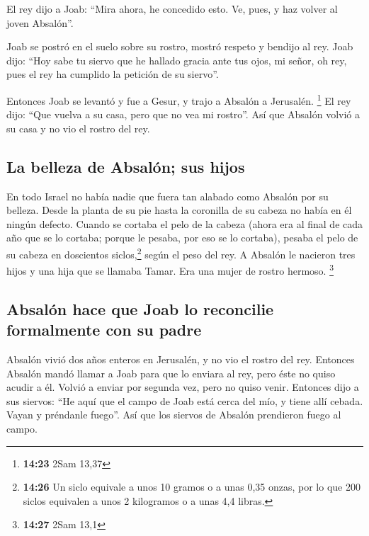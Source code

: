  El rey dijo a Joab: ``Mira ahora, he concedido esto. Ve,
pues, y haz volver al joven Absalón''.

 Joab se postró en el suelo sobre su rostro, mostró
respeto y bendijo al rey. Joab dijo: ``Hoy sabe tu siervo que he hallado
gracia ante tus ojos, mi señor, oh rey, pues el rey ha cumplido la
petición de su siervo''.

 Entonces Joab se levantó y fue a Gesur, y trajo a
Absalón a Jerusalén. \footnote{\textbf{14:23} 2Sam 13,37}
 El rey dijo: ``Que vuelva a su casa, pero que no vea mi
rostro''. Así que Absalón volvió a su casa y no vio el rostro del rey.

\hypertarget{la-belleza-de-absaluxf3n-sus-hijos}{%
\subsection{La belleza de Absalón; sus
hijos}\label{la-belleza-de-absaluxf3n-sus-hijos}}

 En todo Israel no había nadie que fuera tan alabado como
Absalón por su belleza. Desde la planta de su pie hasta la coronilla de
su cabeza no había en él ningún defecto.  Cuando se
cortaba el pelo de la cabeza (ahora era al final de cada año que se lo
cortaba; porque le pesaba, por eso se lo cortaba), pesaba el pelo de su
cabeza en doscientos siclos,\footnote{\textbf{14:26} Un siclo equivale a
  unos 10 gramos o a unas 0,35 onzas, por lo que 200 siclos equivalen a
  unos 2 kilogramos o a unas 4,4 libras.} según el peso del rey.
 A Absalón le nacieron tres hijos y una hija que se
llamaba Tamar. Era una mujer de rostro hermoso. \footnote{\textbf{14:27}
  2Sam 13,1}

\hypertarget{absaluxf3n-hace-que-joab-lo-reconcilie-formalmente-con-su-padre}{%
\subsection{Absalón hace que Joab lo reconcilie formalmente con su
padre}\label{absaluxf3n-hace-que-joab-lo-reconcilie-formalmente-con-su-padre}}

 Absalón vivió dos años enteros en Jerusalén, y no vio el
rostro del rey.  Entonces Absalón mandó llamar a Joab
para que lo enviara al rey, pero éste no quiso acudir a él. Volvió a
enviar por segunda vez, pero no quiso venir.  Entonces
dijo a sus siervos: ``He aquí que el campo de Joab está cerca del mío, y
tiene allí cebada. Vayan y préndanle fuego''. Así que los siervos de
Absalón prendieron fuego al campo.


